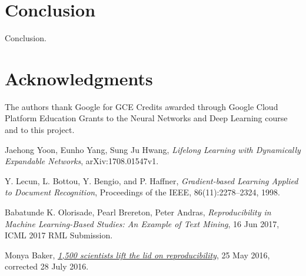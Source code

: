 \documentclass[12pt]{article}
\begin{document}
    \section {Conclusion}
    
    Conclusion.

    \section{Acknowledgments}

    The authors thank Google for GCE Credits awarded through Google Cloud Platform Education Grants
    to the Neural Networks and Deep Learning course and to this project.    
        
    \begin{thebibliography}{9}
            Jaehong Yoon, Eunho Yang, Sung Ju Hwang,
            \textit{Lifelong Learning with Dynamically Expandable Networks},
            arXiv:1708.01547v1.

            Y. Lecun, L. Bottou, Y. Bengio, and P. Haffner,
            \textit{Gradient-based Learning Applied to Document Recognition},
            Proceedings of the IEEE, 86(11):2278–2324, 1998.

            Babatunde K. Olorisade, Pearl Brereton, Peter Andras, 
            \textit{Reproducibility in Machine Learning-Based Studies: An Example of Text Mining},
            16 Jun 2017, ICML 2017 RML Submission.

            Monya Baker,
            \href{https://www.nature.com/news/1-500-scientists-lift-the-lid-on-reproducibility-1.19970}{\textit{1,500 scientists lift the lid on reproducibility}},
            25 May 2016, corrected 28 July 2016.

    \end{thebibliography}
    
    
\end{document}
